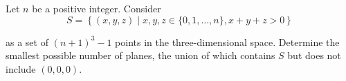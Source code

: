 Let $ n$ be a positive integer. Consider\[ S = \left\{ (x,y,z) \mid x,y,z \in \{ 0, 1, \ldots, n\}, x + y + z > 0 \right \}
\]

as a set of $ (n + 1)^{3} - 1$ points in the three-dimensional space. Determine the smallest possible number of planes, the union of which contains $ S$ but does not include $ (0,0,0)$.

